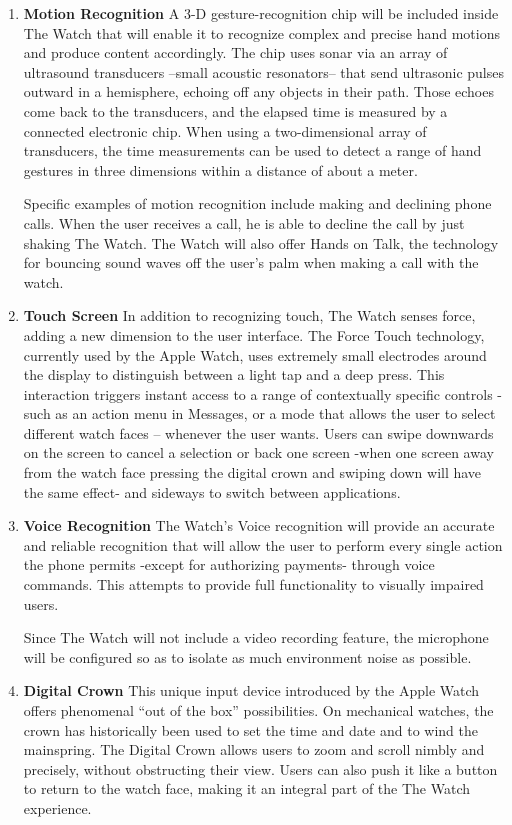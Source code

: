 \documentclass{article}
\begin{document}
\begin{enumerate}
\item \textbf{Motion Recognition}
A 3-D gesture-recognition chip will be included inside The Watch that will enable it to recognize complex and precise hand motions and produce content accordingly. The chip uses sonar via an array of ultrasound transducers --small acoustic resonators-- that send ultrasonic pulses outward in a hemisphere, echoing off any objects in their path. Those echoes come back to the transducers, and the elapsed time is measured by a connected electronic chip. When using a two-dimensional array of transducers, the time measurements can be used to detect a range of hand gestures in three dimensions within a distance of about a meter. 

Specific examples of motion recognition include making and declining phone calls. When the user receives a call, he is able to decline the call by just shaking The Watch. The Watch will also offer Hands on Talk, the technology for bouncing sound waves off the user’s palm when making a call with the watch. 

\item \textbf{Touch Screen}
In addition to recognizing touch, The Watch senses force, adding a new dimension to the user interface. The Force Touch technology, currently used by the Apple Watch, uses extremely small electrodes around the display to distinguish between a light tap and a deep press. This interaction triggers instant access to a range of contextually specific controls -such as an action menu in Messages, or a mode that allows the user to select different watch faces -- whenever the user wants. 
Users can swipe downwards on the screen to cancel a selection or back one screen -when one screen away from the watch face pressing the digital crown and swiping down will have the same effect- and sideways to switch between applications.  

\item \textbf{Voice Recognition }
The Watch's Voice recognition will provide an accurate and reliable recognition that will allow the user to perform every single action the phone permits -except for authorizing payments- through voice commands. This attempts to provide full functionality to visually impaired users. 

Since The Watch will not include a video recording feature, the microphone will be configured so as to isolate as much environment noise as possible.

\item \textbf{Digital Crown}
This unique input device introduced by the Apple Watch offers phenomenal ``out of the box'' possibilities. On mechanical watches, the crown has historically been used to set the time and date and to wind the mainspring. The Digital Crown allows users to zoom and scroll nimbly and precisely, without obstructing their view. Users can also push it like a button to return to the watch face, making it an integral part of the The Watch experience. 


\end{enumerate}
\end{document}
